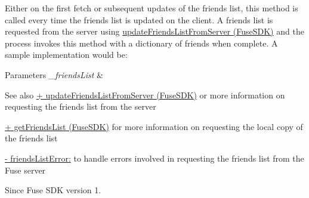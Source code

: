Either on the first fetch or subsequent updates of the friends list, this method is called every time the friends list is updated on the client. A friends list is requested from the server using \hyperlink{interface_fuse_s_d_k_a11a92658dca5be9d79ca19a66bafb91e}{update\+Friends\+List\+From\+Server (\+Fuse\+S\+D\+K)} and the process invokes this method with a dictionary of friends when complete. A sample implementation would be\+:





\begin{DoxyParams}{Parameters}
{\em \+\_\+friends\+List} & \\
\hline
\end{DoxyParams}
\begin{DoxySeeAlso}{See also}
\hyperlink{interface_fuse_s_d_k_a11a92658dca5be9d79ca19a66bafb91e}{+ update\+Friends\+List\+From\+Server (\+Fuse\+S\+D\+K)} or more information on requesting the friends list from the server 

\hyperlink{interface_fuse_s_d_k_a31d609ce39be3e6eda04fd32d8036e95}{+ get\+Friends\+List (\+Fuse\+S\+D\+K)} for more information on requesting the local copy of the friends list 

\hyperlink{protocol_fuse_delegate-p_a071433b93b221cbab7c0f112903e4718}{-\/ friends\+List\+Error\+:} to handle errors involved in requesting the friends list from the Fuse server 
\end{DoxySeeAlso}
\begin{DoxySince}{Since}
Fuse S\+D\+K version 1. 
\end{DoxySince}
\hypertarget{protocol_fuse_delegate-p_adb2a01d8912d54c4a05a675e10901f6e}{}
